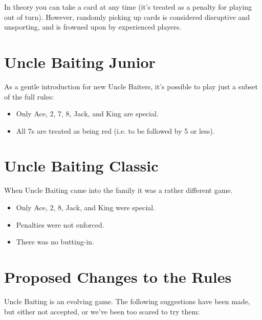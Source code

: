 \documentclass[12pt]{article}
\begin{document}
In theory you can take a card at any time (it's treated as a penalty for
playing out of turn).  However, randomly picking up cards is considered disruptive and unsporting,
and is frowned upon by experienced players.

\section{Uncle Baiting Junior}
\label{Junior}

As a gentle introduction for new Uncle Baiters, it's possible to play just a subset of the full rules:
\begin{itemize}
  \item Only Ace, 2, 7, 8, Jack, and King are special.

  \item All 7s are treated as being red (i.e. to be followed by 5 or less).
\end{itemize}

\section{Uncle Baiting Classic}
\label{Classic}

When Uncle Baiting came into the family it was a rather different game.

\begin{itemize}
  \item Only Ace, 2, 8, Jack, and King were special.

  \item Penalties were not enforced.

  \item There was no butting-in.
\end{itemize}

\section{Proposed Changes to the Rules}
\label{proposedChanges}

Uncle Baiting is an evolving game.  The following suggestions have been made, but
either not accepted, or we've been too scared to try them:
\end{document}
